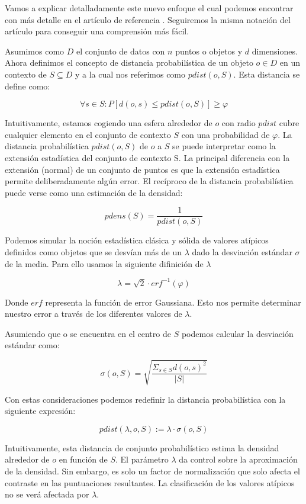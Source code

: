 Vamos a explicar detalladamente este nuevo enfoque el cual podemos encontrar con 
más detalle en el artículo de referencia \cite{kriegelLoOPLocalOutlier2009}. 
Seguiremos la misma notación del artículo para conseguir una comprensión 
más fácil.

Asumimos como $D$ el conjunto de datos con $n$ puntos o objetos y $d$ dimensiones.
Ahora definimos el concepto de distancia probabilística de un objeto $ o \in D$ 
en un contexto de $S \subseteq D$ y a la cual nos referimos como $pdist(o,S)$. 
Esta distancia se define como:

\[ 	\forall s \in S: P[d(o,s) \leq pdist(o,S)] \geq \varphi  \]

Intuitivamente, estamos cogiendo una esfera alrededor de $o$ con radio $pdist $
cubre cualquier elemento en el conjunto de contexto $S$ con una probabilidad de
$\varphi$. La distancia probabilística $pdist (o, S)$ de $o$ a $S$ se puede 
interpretar como la extensión estadística del conjunto de contexto S. La principal 
diferencia con la extensión (normal) de un conjunto de puntos es que la extensión 
estadística permite deliberadamente algún error. El recíproco de la distancia 
probabilística puede verse como una estimación de la densidad:

\[ 	pdens(S) = \frac{1}{pdist(o,S)} \]

Podemos simular la noción estadística clásica y sólida de valores atípicos
definidos como objetos que se desvían más de un $\lambda$ dado la desviación
estándar $\sigma$ de la media. Para ello usamos la siguiente difinición de $\lambda$

\[ 	 \lambda = \sqrt{2} \cdot erf^{-1}(\varphi) \]

Donde $erf$ representa la función de error Gaussiana. Esto nos permite determinar
nuestro error a través de los diferentes valores de $\lambda$.


Asumiendo que o se encuentra en el centro de $S$ podemos calcular la desviación 
estándar como:

\[ \sigma(o,S) = \sqrt{ \frac{\Sigma_{s \in S} d(o,s)^2 }{|S|} }    \]

Con estas consideraciones podemos redefinir la distancia probabilística con
la siguiente expresión:


\[ pdist(\lambda,o,S) := \lambda \cdot \sigma(o,S) \]

Intuitivamente, esta distancia de conjunto probabilístico estima la densidad 
alrededor de $o$ en función de $S$. El parámetro $\lambda$ da control sobre 
la aproximación de la densidad. Sin embargo, es solo un factor de normalización 
que solo afecta el contraste en las puntuaciones resultantes. La clasificación 
de los valores atípicos no se verá afectada por $\lambda$.

